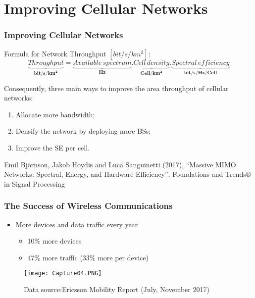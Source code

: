 \documentclass{beamer}
\begin{document}
\section{Improving Cellular Networks}

\begin{frame}[fragile=singleslide]\frametitle{Improving Cellular Networks}

 Formula for Network Throughput $[bit/s/km^2]$:
\begin{equation}\label{throughput}  
\underbrace{Throughput}_{\mathbf{bit/s/km^2}}=\underbrace{Available\,spectrum}_{\mathbf{Hz}}.\underbrace{Cell\,density}_{\mathbf{Cell/km^2}}.\underbrace{Spectral\,efficiency}_{\mathbf{bit/s/Hz/Cell}}
\end{equation}


Consequently, three main ways to improve the area throughput of cellular networks:

\hspace{1cm}
\begin{enumerate}
\item Allocate more bandwidth;
\item Densify the network by deploying more BSs;
\item Improve the SE per cell.
\end{enumerate}

\vspace{1.2cm}

\tiny Emil Björnson, Jakob Hoydis and Luca Sanguinetti (2017), “Massive MIMO Networks: Spectral, Energy, and Hardware Efficiency”, Foundations and Trends® in Signal Processing

\end{frame}


\begin{frame}[fragile=singleslide]\frametitle{The Success of Wireless Communications}

\begin{itemize}
\item More devices and data traffic every year
\begin{itemize}
\item 10\% more devices
\item 47\% more traffic (33\% more per device)
\end{itemize}
\end{itemize}
\begin{figure}
  \texttt{[image: Capture04.PNG]}
\caption{Data source:Ericsson Mobility Report (July, November 2017)} 
\end{figure}
\end{frame}
\end{document}
